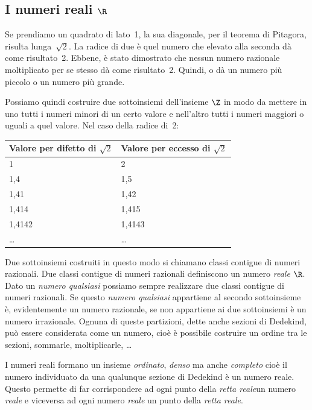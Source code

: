 \subsection{I numeri reali $\R$}
\label{subsec:insnum_reali}

Se prendiamo un quadrato di lato~1, la sua diagonale, per il teorema di 
Pitagora, risulta lunga~$\sqrt{2}$. 
La radice di due è quel numero che elevato alla seconda dà come risultato~2.
Ebbene, è stato dimostrato che nessun numero razionale moltiplicato per se 
stesso dà come risultato~2. Quindi, o dà un numero più piccolo o un numero più 
grande.

Possiamo quindi costruire due sottoinsiemi dell'insieme $\Z$ in modo da mettere 
in uno tutti i numeri minori di un certo valore e nell'altro tutti i numeri 
maggiori o uguali a quel valore. Nel caso della radice di~2:

\begin{center}
 \begin{tabular}{ll}
\toprule
Valore per difetto di $\sqrt{2}$ &Valore per eccesso di $\sqrt{2}$ \\
\midrule
1& 2\\
1,4& 1,5 \\
1,41& 1,42\\
1,414& 1,415\\
1,4142& 1,4143\\
\ldots& \ldots\\
\bottomrule
\end{tabular}
\end{center}

Due sottoinsiemi costruiti in questo modo si chiamano classi contigue di 
numeri razionali. Due classi contigue di numeri razionali definiscono un numero 
\emph{reale} $\R$. Dato un \emph{numero qualsiasi} possiamo sempre realizzare 
due classi contigue di numeri razionali. Se questo \emph{numero qualsiasi} 
appartiene al secondo sottoinsieme è, evidentemente un numero razionale, se non 
appartiene ai due sottoinsiemi è un numero irrazionale. Ognuna di queste 
partizioni, dette anche sezioni di Dedekind, può essere considerata come un
numero, cioè è possibile costruire un ordine tra le sezioni, sommarle, 
moltiplicarle, \dots

I numeri reali formano un insieme \emph{ordinato}, \emph{denso} ma anche 
\emph{completo} cioè il numero individuato da una qualunque sezione di Dedekind 
è un numero reale.
Questo permette di far corrispondere ad ogni punto della \emph{retta reale}un 
numero \emph{reale} e viceversa 
ad ogni numero \emph{reale} un punto della \emph{retta reale}. 

